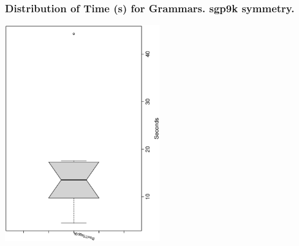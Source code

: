  \begin{frame}
 \frametitle{ Distribution of Time (s) for Grammars. sgp9k  symmetry. }
 \begin{center}
\includegraphics[width=0.5\textwidth, angle=-90]
{ExpFboxplottSeconds007.eps}
 \end{center}
 \label{ExpFboxplottSeconds007.eps}  
 \end{frame}

